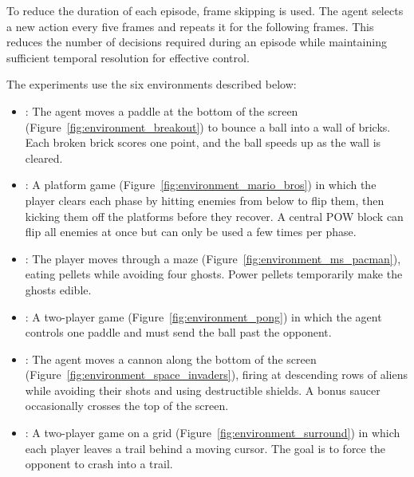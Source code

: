 To reduce the duration of each episode, frame skipping is used.
The agent selects a new action every five frames and repeats it for the following frames.
This reduces the number of decisions required during an episode while maintaining sufficient temporal resolution for effective control.



The experiments use the six environments described below:
\begingroup
\renewenvironment{samepage}{}{}
\begin{itemize}
    \item \BreakoutName: The agent moves a paddle at the bottom of the screen (Figure~\ref{fig:environment_breakout}) to bounce a ball into a wall of bricks.
    Each broken brick scores one point, and the ball speeds up as the wall is cleared.
    \allowbreak

    \item \MarioBrosName: A platform game (Figure~\ref{fig:environment_mario_bros}) in which the player clears each phase by hitting enemies from below to flip them, then kicking them off the platforms before they recover.
    A central POW block can flip all enemies at once but can only be used a few times per phase.
    \allowbreak

    \item \MsPacManName: The player moves through a maze (Figure~\ref{fig:environment_ms_pacman}), eating pellets while avoiding four ghosts.
    Power pellets temporarily make the ghosts edible.
    \allowbreak

    \item \PongName: A two-player game (Figure~\ref{fig:environment_pong}) in which the agent controls one paddle and must send the ball past the opponent.
    \allowbreak

    \item \SpaceInvadersName: The agent moves a cannon along the bottom of the screen (Figure~\ref{fig:environment_space_invaders}), firing at descending rows of aliens while avoiding their shots and using destructible shields.
    A bonus saucer occasionally crosses the top of the screen.
    \allowbreak

    \item \SurroundName: A two-player game on a grid (Figure~\ref{fig:environment_surround}) in which each player leaves a trail behind a moving cursor.
    The goal is to force the opponent to crash into a trail.
\end{itemize}
\endgroup

